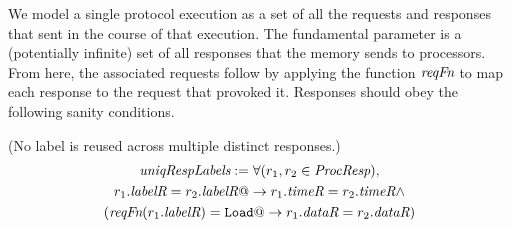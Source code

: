 
We model a single protocol execution as a set of all the requests and responses
that sent in the course of that execution.
The fundamental parameter is a (potentially infinite) set \Response{} of all responses
that the memory sends to processors.  From here, the associated requests follow by
applying the function $\textit{reqFn}$ to map each response to the request that provoked it.
Responses should obey the following sanity conditions. 
\begin{defn} (No label is reused across multiple distinct responses.)
\small
\begin{multline*}
\textit{uniqRespLabels} := \forall (r_1, r_2 \in \textit{ProcResp}),\\
r_1.\textit{labelR} = r_2.\textit{labelR} @-> r_1.\textit{timeR} = r_2.\textit{timeR} \wedge\\
(\textit{reqFn}(r_1.\textit{labelR}) = \texttt{Load} @-> r_1.\textit{dataR} = r_2.\textit{dataR})
\end{multline*}
\label{uniqRespLabels}
\end{defn}

